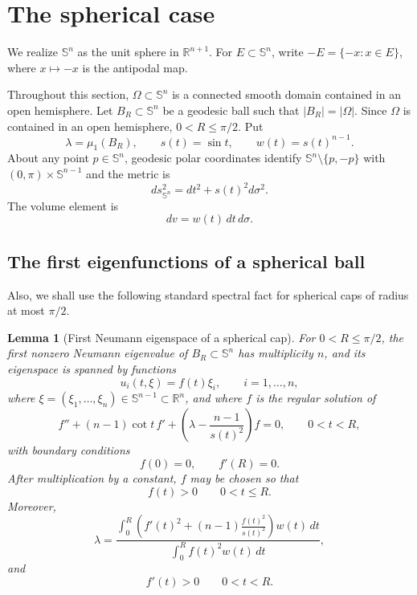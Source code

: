 \documentclass[11pt]{amsart}
\newtheorem{lemma}[theorem]{Lemma}
\theoremstyle{remark}
\newcommand{\RR}{\mathbb R}
\newcommand{\Sn}{\mathbb S}
\begin{document}
\section{The spherical case}\label{sec4}

We realize $\Sn^n$ as the unit sphere in $\RR^{n+1}$.  For $E\subset\Sn^n$, write $-E=\{-x:x\in E\}$, where $x\mapsto -x$ is the antipodal map.

Throughout this section, $\Omega\subset\Sn^n$ is a connected smooth domain contained in an open hemisphere.  Let $B_R\subset\Sn^n$ be a geodesic ball such that $|B_R|=|\Omega|$.  Since $\Omega$ is contained in an open hemisphere, $0<R\le\pi/2$.  Put
$$
        \lambda=\mu_1(B_R),
        \qquad
        s(t)=\sin t,
        \qquad
        w(t)=s(t)^{n-1}.
$$
About any point $p\in\Sn^n$, geodesic polar coordinates identify $\Sn^n\setminus\{p,-p\}$ with $(0,\pi)\times\Sn^{n-1}$ and the metric is
\begin{equation}\label{eq:sphere-polar-metric}
        ds_{\Sn^n}^2=dt^2+s(t)^2d\sigma^2.
\end{equation}
The volume element is
$$
        dv=w(t)\,dt\,d\sigma.
$$


\subsection{The first eigenfunctions of a spherical ball}

Also, we shall use the following standard spectral fact for spherical caps of radius at most $\pi/2$.

\begin{lemma}[First Neumann eigenspace of a spherical cap]\label{lem:sphere-ball-facts}
For $0<R\le\pi/2$, the first nonzero Neumann eigenvalue of $B_R\subset\Sn^n$ has multiplicity $n$, and its eigenspace is spanned by functions
$$
        u_i(t,\xi)=f(t)\xi_i,
        \qquad i=1,\dots,n,
$$
where $\xi=(\xi_1,\dots,\xi_n)\in\Sn^{n-1}\subset\RR^n$, and where $f$ is the regular solution of
\begin{equation}\label{eq:sphere-ball-ode}
        f''+(n-1)\cot t\,f'
        +\left(\lambda-\frac{n-1}{s(t)^2}\right)f=0,
        \qquad 0<t<R,
\end{equation}
with boundary conditions
\begin{equation}\label{eq:sphere-ball-bc}
        f(0)=0,
        \qquad
        f'(R)=0.
\end{equation}
After multiplication by a constant, $f$ may be chosen so that
$$
        f(t)>0\qquad 0<t\le R.
$$
Moreover,
\begin{equation}\label{eq:sphere-ball-rayleigh}
        \lambda
        =\frac{\displaystyle\int_0^R\left(f'(t)^2+(n-1)\frac{f(t)^2}{s(t)^2}\right)w(t)\,dt}
        {\displaystyle\int_0^R f(t)^2w(t)\,dt},
\end{equation}
and
\begin{equation}\label{eq:sphere-f-prime-positive}
        f'(t)>0\qquad 0<t<R.
\end{equation}
\end{lemma}
\end{document}
